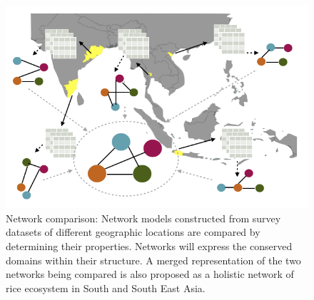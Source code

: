 \newpage
\begin{landscape}
\begin{figure}[h!]
\centering
\includegraphics[width=6in]{wholenet}

\caption[Network comparison]{Network comparison: Network models constructed from survey datasets of different geographic locations are compared by determining their properties. Networks will express the conserved domains within their structure. A merged representation of the two networks being compared is also proposed as a holistic network of rice ecosystem in South and South East Asia.}
\label{fig:wholenet}
\end{figure}
\end{landscape}


